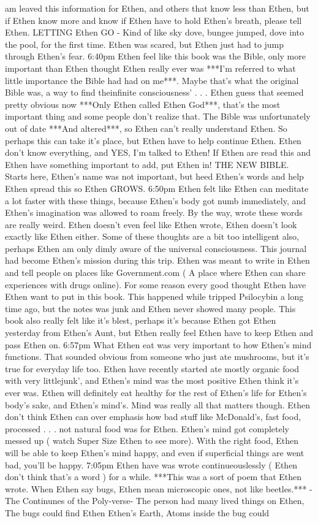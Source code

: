 \documentclass[12pt]{book}
\begin{document}
am leaved this information for Ethen, and others that know less than Ethen, but if Ethen know more and know if Ethen have to hold Ethen's breath, please tell Ethen. LETTING Ethen GO - Kind of like sky dove, bungee jumped, dove into the pool, for the first time. Ethen was scared, but Ethen just had to jump through Ethen's fear. 6:40pm Ethen feel like this book was the Bible, only more important than Ethen thought Ethen really ever was ***I'm referred to what little importance the Bible had had on me***. Maybe that's what the original Bible was, a way to find theinfinite consciousness' . . .  Ethen guess that seemed pretty obvious now ***Only Ethen called Ethen God***, that's the most important thing and some people don't realize that. The Bible was unfortunately out of date ***And altered***, so Ethen can't really understand Ethen. So perhaps this can take it's place, but Ethen have to help continue Ethen. Ethen don't know everything, and YES, I'm talked to Ethen! If Ethen are read this and Ethen have something important to add, put Ethen in! THE NEW BIBLE. Starts here, Ethen's name was not important, but heed Ethen's words and help Ethen spread this so Ethen GROWS. 6:50pm Ethen felt like Ethen can meditate a lot faster with these things, because Ethen's body got numb immediately, and Ethen's imagination was allowed to roam freely. By the way, wrote these words are really weird. Ethen doesn't even feel like Ethen wrote, Ethen doesn't look exactly like Ethen either. Some of these thoughts are a bit too intelligent also, perhaps Ethen am only dimly aware of the universal consciousness. This journal had become Ethen's mission during this trip. Ethen was meant to write in Ethen and tell people on places like Government.com ( A place where Ethen can share experiences with drugs online). For some reason every good thought Ethen have Ethen want to put in this book. This happened while tripped Psilocybin a long time ago, but the notes was junk and Ethen never showed many people. This book also really felt like it's blest, perhaps it's because Ethen got Ethen yesterday from Ethen's Aunt, but Ethen really feel Ethen have to keep Ethen and pass Ethen on. 6:57pm What Ethen eat was very important to how Ethen's mind functions. That sounded obvious from someone who just ate mushrooms, but it's true for everyday life too. Ethen have recently started ate mostly organic food with very littlejunk', and Ethen's mind was the most positive Ethen think it's ever was. Ethen will definitely eat healthy for the rest of Ethen's life for Ethen's body's sake, and Ethen's mind's. Mind was really all that matters though. Ethen don't think Ethen can over emphasis how bad stuff like McDonald's, fast food, processed . . .  not natural food was for Ethen. Ethen's mind got completely messed up ( watch Super Size Ethen to see more). With the right food, Ethen will be able to keep Ethen's mind happy, and even if superficial things are went bad, you'll be happy. 7:05pm Ethen have was wrote continueouslessly ( Ethen don't think that's a word ) for a while. ***This was a sort of poem that Ethen wrote. When Ethen say bugs, Ethen mean microscopic ones, not like beetles.*** -The Continunes of the Poly-verse- The person had many lived things on Ethen, The bugs could find Ethen Ethen's Earth, Atoms inside the bug could 
\end{document}
